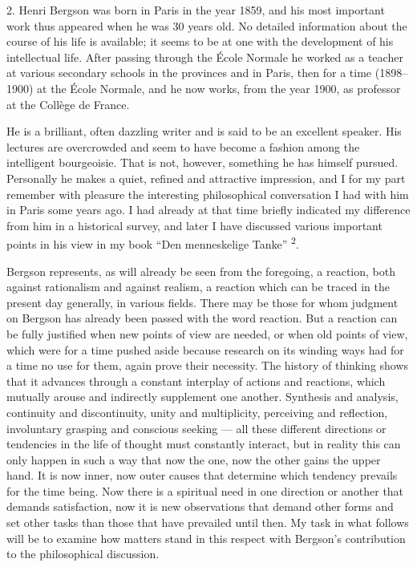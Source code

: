 \documentclass[12pt,a4paper,openany]{book}
\newcommand{\opage}[1]{\marginnote{\footnotesize\textit{[#1]}}}
\newcommand{\nm}[1]{\unskip\textsuperscript{#1}}
\begin{document}
2. Henri Bergson was born in Paris in the year 1859, and his most important work thus appeared when he was 30 years old. No detailed information about the course of his life is available; it seems to be at one with the development of his intellectual life. After passing through the École Normale he worked as a teacher at various secondary schools in the provinces and in Paris, then for a time (1898--1900) at the École Normale, and he now works, from the year 1900, as professor at the Collège de France.

He is a brilliant, often dazzling writer and is said to be an excellent speaker. His lectures are overcrowded and seem to have become a fashion among the intelligent bourgeoisie. That is not, however, something he has himself pursued. Personally he makes a quiet, refined and attractive impression, and
\opage{4}I for my part remember with pleasure the interesting philosophical conversation I had with him in Paris some years ago. I had already at that time briefly indicated my difference from him in a historical survey, and later I have discussed various important points in his view in my book ``Den menneskelige Tanke'' \nm{2}.

Bergson represents, as will already be seen from the foregoing, a reaction, both against rationalism and against realism, a reaction which can be traced in the present day generally, in various fields. There may be those for whom judgment on Bergson has already been passed with the word reaction. But a reaction can be fully justified when new points of view are needed, or when old points of view, which were for a time pushed aside because research on its winding ways had for a time no use for them, again prove their necessity. The history of thinking shows that it advances through a constant interplay of actions and reactions, which mutually arouse and indirectly supplement one another. Synthesis and analysis, continuity and discontinuity, unity and multiplicity, perceiving and reflection, involuntary grasping and conscious seeking --- all these different directions or tendencies in the life of thought must constantly interact, but in reality this can only happen in such a way that now the one, now the other gains the upper hand. It is now inner, now outer causes that determine which tendency prevails for the time being. Now there is a spiritual need in one direction or another that demands satisfaction, now it is new observations that demand other forms and set other tasks than those that have prevailed until then. My task in what follows will be to examine how matters stand in this %
respect with Bergson's contribution to the philosophical discussion.
\end{document}
